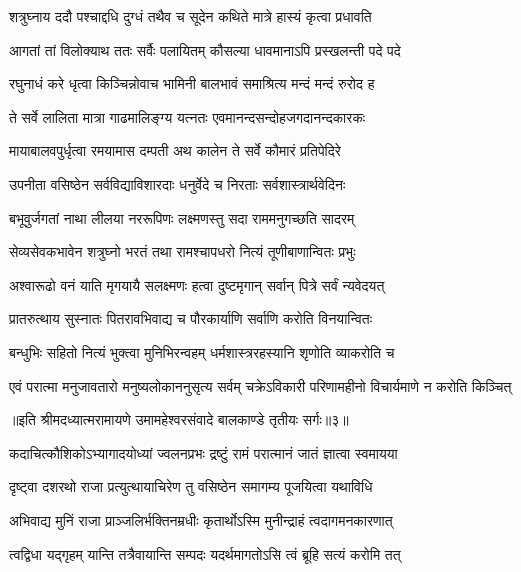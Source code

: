 \twolineshloka
{शत्रुघ्नाय ददौ पश्चाद्दधि दुग्धं तथैव च}
{सूदेन कथिते मात्रे हास्यं कृत्वा प्रधावति} %

\twolineshloka
{आगतां तां विलोक्याथ ततः सर्वैः पलायितम्}
{कौसल्या धावमानाऽपि प्रस्खलन्ती पदे पदे} %

\twolineshloka
{रघुनाधं करे धृत्वा किञ्चिन्नोवाच भामिनी}
{बालभावं समाश्रित्य मन्दं मन्दं रुरोद ह} %

\twolineshloka
{ते सर्वे लालिता मात्रा गाढमालिङ्ग्य यत्नतः}
{एवमानन्दसन्दोहजगदानन्दकारकः} %

\twolineshloka
{मायाबालवपुर्धृत्वा रमयामास दम्पती}
{अथ कालेन ते सर्वे कौमारं प्रतिपेदिरे} %

\twolineshloka
{उपनीता वसिष्ठेन सर्वविद्याविशारदाः}
{धनुर्वेदे च निरताः सर्वशास्त्रार्थवेदिनः} %

\twolineshloka
{बभूवुर्जगतां नाथा लीलया नररूपिणः}
{लक्ष्मणस्तु सदा राममनुगच्छति सादरम्} %

\twolineshloka
{सेव्यसेवकभावेन शत्रुघ्नो भरतं तथा}
{रामश्चापधरो नित्यं तूणीबाणान्वितः प्रभुः} %

\twolineshloka
{अश्वारूढो वनं याति मृगयायै सलक्ष्मणः}
{हत्वा दुष्टमृगान् सर्वान् पित्रे सर्वं न्यवेदयत्} %

\twolineshloka
{प्रातरुत्थाय सुस्नातः पितरावभिवाद्य च}
{पौरकार्याणि सर्वाणि करोति विनयान्वितः} %

\twolineshloka
{बन्धुभिः सहितो नित्यं भुक्त्वा मुनिभिरन्वहम्}
{धर्मशास्त्ररहस्यानि शृणोति व्याकरोति च} %

\twolineshloka
{एवं परात्मा मनुजावतारो मनुष्यलोकाननुसृत्य सर्वम्}
{चक्रेऽविकारी परिणामहीनो विचार्यमाणे न करोति किञ्चित्} %

{॥इति श्रीमदध्यात्मरामायणे उमामहेश्वरसंवादे
बालकाण्डे तृतीयः सर्गः॥३॥
}





\twolineshloka
{कदाचित्कौशिकोऽभ्यागादयोध्यां ज्वलनप्रभः}
{द्रष्टुं रामं परात्मानं जातं ज्ञात्वा स्वमायया} %

\twolineshloka
{दृष्ट्वा दशरथो राजा प्रत्युत्थायाचिरेण तु}
{वसिष्ठेन समागम्य पूजयित्वा यथाविधि} %

\twolineshloka
{अभिवाद्य मुनिं राजा प्राञ्जलिर्भक्तिनम्रधीः}
{कृतार्थोऽस्मि मुनीन्द्राहं त्वदागमनकारणात्} %

\twolineshloka
{त्वद्विधा यद्गृहम् यान्ति तत्रैवायान्ति सम्पदः}
{यदर्थमागतोऽसि त्वं ब्रूहि सत्यं करोमि तत्} %

